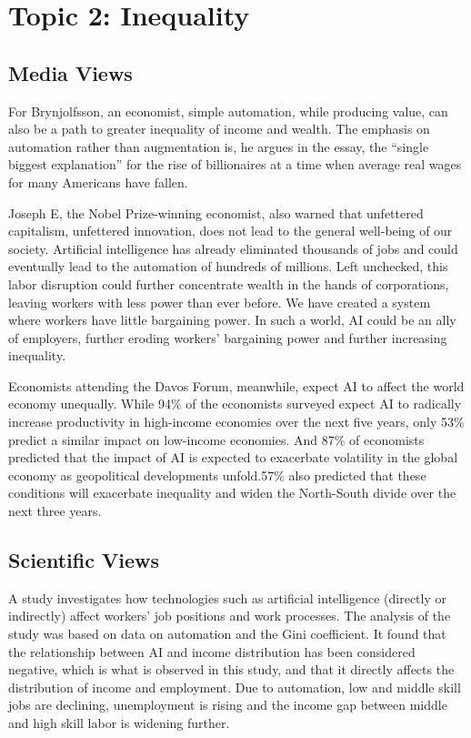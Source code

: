 \documentclass[11pt]{article}
\begin{document}
\section{Topic 2: Inequality}

\subsection{Media Views}

For Brynjolfsson, an economist, simple automation, while producing value, can also be a path to greater inequality of income and wealth. The emphasis on automation rather than augmentation is, he argues in the essay, the “single biggest explanation” for the rise of billionaires at a time when average real wages for many Americans have fallen. \cite{Rotman2022} 

Joseph E, the Nobel Prize-winning economist, also warned that unfettered capitalism, unfettered innovation, does not lead to the general well-being of our society. Artificial intelligence has already eliminated thousands of jobs and could eventually lead to the automation of hundreds of millions. Left unchecked, this labor disruption could further concentrate wealth in the hands of corporations, leaving workers with less power than ever before. We have created a system where workers have little bargaining power. In such a world, AI could be an ally of employers, further eroding workers' bargaining power and further increasing inequality.\cite{Sophie2013}

Economists attending the Davos Forum, meanwhile, expect AI to affect the world economy unequally. While 94\% of the economists surveyed expect AI to radically increase productivity in high-income economies over the next five years, only 53\% predict a similar impact on low-income economies. And 87\% of economists predicted that the impact of AI is expected to exacerbate volatility in the global economy as geopolitical developments unfold.57\% also predicted that these conditions will exacerbate inequality and widen the North-South divide over the next three years.\cite{AlJazeera2024}

\subsection{Scientific Views}

A study \cite{goyal2020artificial} investigates how technologies such as artificial intelligence (directly or indirectly) affect workers' job positions and work processes. The analysis of the study was based on data on automation and the Gini coefficient. It found that the relationship between AI and income distribution has been considered negative, which is what is observed in this study, and that it directly affects the distribution of income and employment. Due to automation, low and middle skill jobs are declining, unemployment is rising and the income gap between middle and high skill labor is widening further.
\end{document}
